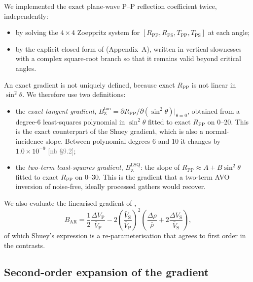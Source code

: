 \documentclass[11pt]{article}
\newcommand{\VP}{V_\mathrm{P}}
\newcommand{\VS}{V_\mathrm{S}}
\newcommand{\RPP}{R_\mathrm{PP}}
\newcommand{\Btan}{B_\mathrm{Z}^{\tan}}
\newcommand{\Blsq}{B_\mathrm{Z}^{\mathrm{LSQ}}}
\newcommand{\BAR}{B_\mathrm{AR}}
\newif\ifshownb \shownbtrue
\newcommand{\nb}[1]{\ifshownb\textcolor{gray}{[nb #1]}\fi}
\begin{document}
We implemented the exact plane-wave P--P reflection coefficient twice, independently:
\begin{itemize}
\item by solving the $4\times4$ Zoeppritz system for $[\RPP,R_\mathrm{PS},T_\mathrm{PP},T_\mathrm{PS}]$ at each angle;
\item by the explicit closed form of \citet[][their equation 5.39]{aki1980} (Appendix~A), written in vertical slownesses with a complex square-root branch so that it remains valid beyond critical angles.
\end{itemize}
An exact gradient is not uniquely defined, because exact $\RPP$ is not linear in $\sin^2\theta$. We therefore use two definitions:
\begin{itemize}
\item the \emph{exact tangent gradient}, $\Btan=\partial\RPP/\partial(\sin^2\theta)|_{\theta=0}$, obtained from a degree-6 least-squares polynomial in $\sin^2\theta$ fitted to exact $\RPP$ on 0\textdegree--20\textdegree. This is the exact counterpart of the Shuey gradient, which is also a normal-incidence slope. Between polynomial degrees 6 and 10 it changes by $1.0\times10^{-9}$ \nb{\S9.2};
\item the \emph{two-term least-squares gradient}, $\Blsq$: the slope of $\RPP\approx A+B\sin^2\theta$ fitted to exact $\RPP$ on 0\textdegree--30\textdegree. This is the gradient that a two-term AVO inversion of noise-free, ideally processed gathers would recover.
\end{itemize}
We also evaluate the linearised gradient of \citet{aki1980},
\begin{equation}
\BAR=\frac12\frac{\Delta\VP}{\bar V_\mathrm{P}}-2\left(\frac{\bar V_\mathrm{S}}{\bar V_\mathrm{P}}\right)^2\left(\frac{\Delta\rho}{\bar\rho}+2\frac{\Delta\VS}{\bar V_\mathrm{S}}\right),
\label{eq:BAR}
\end{equation}
of which Shuey's expression is a re-parameterisation that agrees to first order in the contrasts.

\subsection*{Second-order expansion of the gradient}
\end{document}
